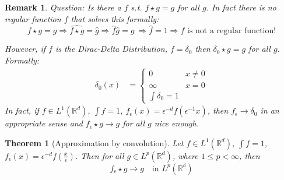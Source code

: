 \documentclass{report}
\theoremstyle{tommy}
\newtheorem{thm}[defn]{Theorem}
\newtheorem{rem}[defn]{Remark}
\begin{document}
  \begin{rem}
      Question: Is there a \(f\) s.t. \(f \star g = g\) for all \(g\). In fact there is no regular function \(f\) that solves this formally:
      \[f \star g = g \Rightarrow \widehat{f \star g} = \hat g \Rightarrow \hat f \hat g = \hat g\ \Rightarrow \hat f = 1 \Rightarrow f \text{ is not a regular function!}\]

      However, if \(f\) is the Dirac-Delta Distribution, \(f = \delta_0\) then \(\delta_0 \star g = g\) for all \(g\). Formally:
      \begin{align*}
        \delta_0(x) &= \begin{cases}
          0 &x \ne 0 \\
          \infty &x = 0 \\
          \int \delta_0 = 1
        \end{cases}
      \end{align*}
      In fact, if \(f \in L^1(\mathbb{R}^d)\), \(\int f = 1\), \(f_\epsilon(x) = \epsilon^{-d} f(\epsilon^{-1} x)\), then \(f_\epsilon \to \delta_0\) in an appropriate sense and \(f_\epsilon \star g \to g\) for all \(g\) nice enough.
  \end{rem}
  
  \begin{thm}[Approximation by convolution]
    Let \(f \in L^1(\mathbb{R}^d)\), \(\int f = 1\), \(f_\epsilon(x) = \epsilon^{-d} f(\frac{x}{\epsilon})\). Then for all \(g \in L^p(\mathbb{R}^d)\), where \(1 \le p < \infty\), then
    \[f_\epsilon \star g \to g \quad \text{in } L^p(\mathbb{{R}^d})\]
  \end{thm}
\end{document}
